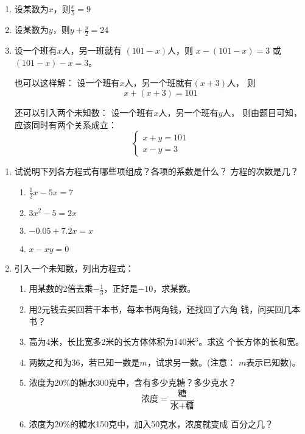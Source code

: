 \begin{solution}
\begin{enumerate}
    \item 设某数为$x$，则$\frac{x}{5}=9$
    \item 设某数为$y$，则$y+\frac{y}{2}=24$
    \item 设一个班有$x$人，另一班就有
  $(101-x)$人，则  $x-(101-x)=3$ 或   $(101-x)-x=3$。

也可以这样解：    设一个班有$x$人，另一个班就有$(x+3)$人，
      则$$x+(x+3)=101$$
      
还可以引入两个未知数：
    设一个班有$x$人，另一个班有$y$人，
则由题目可知，应该同时有两个关系成立：
\[\begin{cases}
    x+y=101\\
    x-y=3
\end{cases}\]
\end{enumerate}    
\end{solution}


\begin{ex}
\begin{enumerate}
    \item 试说明下列各方程式有哪些项组成？各项的系数是什么？
    方程的次数是几？
    \begin{multicols}{2}
        \begin{enumerate}
 \item $\frac{1}{2}x-5x=7$
 \item $3x^2-5=2x$
 \item $-0.05+7.2x=x$
 \item $x-xy=0$           
        \end{enumerate}
    \end{multicols}

\item 引入一个未知数，列出方程式：
\begin{enumerate}
    \item 用某数的2倍去乘$-\frac{1}{3}$，正好是$-10$，求某数。
    \item 用2元钱去买回若干本书，每本书两角钱，还找回了六角
  钱，问买回几本书？
  \item 高为4米，长比宽多2米的长方体体积为140米$^3$。求这
  个长方体的长和宽。
  \item 两数之和为36，若已知一数是$m$，试求另一数。(注意：
  $m$表示已知数)。
  \item 浓度为20\%的糖水300克中，含有多少克糖？多少克水？
  \[\text{浓度}=\frac{\text{糖}}{\text{水+糖}}\]
  \item 浓度为20\%的糖水150克中，加入50克水，浓度就变成
  百分之几？
\end{enumerate}
\end{enumerate}
\end{ex}

